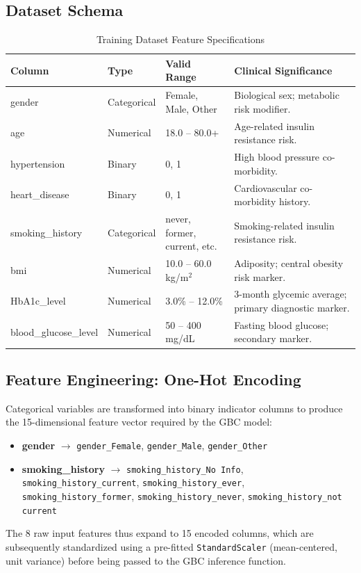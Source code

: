 \documentclass[12pt,a4paper]{report}
\begin{document}
\subsection{Dataset Schema}
\begin{table}[H]
\centering
\caption{Training Dataset Feature Specifications}
\label{tab:dataset_schema}
\begin{tabularx}{\textwidth}{llXX}
\toprule
\textbf{Column} & \textbf{Type} & \textbf{Valid Range} & \textbf{Clinical Significance} \\
\midrule
gender              & Categorical & Female, Male, Other         & Biological sex; metabolic risk modifier. \\
age                 & Numerical   & 18.0 -- 80.0+               & Age-related insulin resistance risk. \\
hypertension        & Binary      & 0, 1                        & High blood pressure co-morbidity. \\
heart\_disease       & Binary      & 0, 1                        & Cardiovascular co-morbidity history. \\
smoking\_history     & Categorical & never, former, current, etc.& Smoking-related insulin resistance risk. \\
bmi                 & Numerical   & 10.0 -- 60.0 kg/m$^2$       & Adiposity; central obesity risk marker. \\
HbA1c\_level         & Numerical   & 3.0\% -- 12.0\%             & 3-month glycemic average; primary diagnostic marker. \\
blood\_glucose\_level & Numerical   & 50 -- 400 mg/dL             & Fasting blood glucose; secondary marker. \\
\bottomrule
\end{tabularx}
\end{table}

\subsection{Feature Engineering: One-Hot Encoding}
Categorical variables are transformed into binary indicator columns to produce the 15-dimensional feature vector required by the GBC model:
\begin{itemize}
    \item \textbf{gender} $\rightarrow$ \texttt{gender\_Female}, \texttt{gender\_Male}, \texttt{gender\_Other}
    \item \textbf{smoking\_history} $\rightarrow$ \texttt{smoking\_history\_No Info}, \texttt{smoking\_history\_current}, \texttt{smoking\_history\_ever}, \texttt{smoking\_history\_former}, \texttt{smoking\_history\_never}, \texttt{smoking\_history\_not current}
\end{itemize}
The 8 raw input features thus expand to 15 encoded columns, which are subsequently standardized using a pre-fitted \texttt{StandardScaler} (mean-centered, unit variance) before being passed to the GBC inference function.
\end{document}
